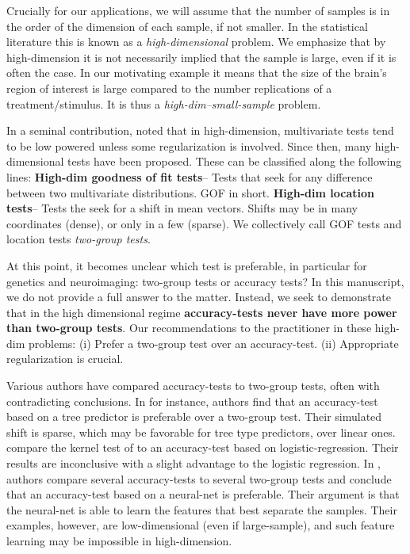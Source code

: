 \documentclass[]{bio}
\begin{document}
Crucially for our applications, we will assume that the number of samples is in the order of the dimension of each sample, if not smaller. 
In the statistical literature this is known as a \emph{high-dimensional} problem. 
We emphasize that by high-dimension it is not necessarily implied that the sample is large, even if it is often the case. 
In our motivating example it means that the size of the brain's region of interest is large compared to the number replications of a treatment/stimulus. 
It is thus a \emph{high-dim--small-sample} problem. 

In a seminal contribution, \citet{bai1996effect} noted that in high-dimension, multivariate tests tend to be low powered unless some regularization is involved. 
Since then, many high-dimensional tests have been proposed. 
These can be classified along the following lines:
\textbf{High-dim goodness of fit tests}-- Tests that seek for any difference between two multivariate distributions. GOF in short.
\textbf{High-dim location tests}-- Tests the seek for a shift in mean vectors. 
Shifts may be in many coordinates (dense), or only in a few (sparse).
We collectively call GOF tests and location tests \emph{two-group tests}. 

At this point, it becomes unclear which test is preferable, in particular for genetics and neuroimaging: two-group tests or accuracy tests?
In this manuscript, we do not provide a full answer to the matter.
Instead, we seek to demonstrate that in the high dimensional regime \textbf{accuracy-tests never have more power than two-group tests}.
Our recommendations to the practitioner in these high-dim problems:
(i) Prefer a two-group test over an accuracy-test. 
(ii) Appropriate regularization is crucial. 

Various authors have compared accuracy-tests to two-group tests, often with contradicting conclusions.
In \cite{yu2007two} for instance, authors find that an accuracy-test based on a tree predictor is preferable over a two-group test. 
Their simulated shift is sparse, which may be favorable for tree type predictors, over linear ones. 
\citet{olivetti2013kernel} compare the kernel test of \cite{gretton_kernel_2012-1} to an accuracy-test based on logistic-regression.
Their results are inconclusive with a slight advantage to the logistic regression.
In \cite{lopez2016revisiting}, authors compare several accuracy-tests to several two-group tests and conclude that an accuracy-test based on a neural-net is preferable. 
Their argument is that the neural-net is able to learn the features that best separate the samples. 
Their examples, however, are low-dimensional (even if large-sample), and such feature learning may be impossible in high-dimension.
\end{document}
